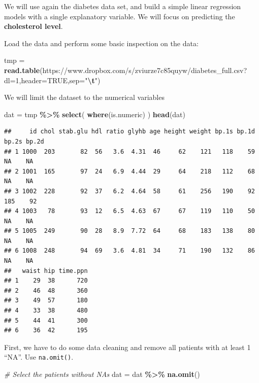 \documentclass[
]{book}
\newenvironment{Shaded}{\begin{snugshade}}{\end{snugshade}}
\newcommand{\AttributeTok}[1]{\textcolor[rgb]{0.13,0.29,0.53}{#1}}
\newcommand{\CommentTok}[1]{\textcolor[rgb]{0.56,0.35,0.01}{\textit{#1}}}
\newcommand{\ConstantTok}[1]{\textcolor[rgb]{0.56,0.35,0.01}{#1}}
\newcommand{\FunctionTok}[1]{\textcolor[rgb]{0.13,0.29,0.53}{\textbf{#1}}}
\newcommand{\NormalTok}[1]{#1}
\newcommand{\OtherTok}[1]{\textcolor[rgb]{0.56,0.35,0.01}{#1}}
\newcommand{\SpecialCharTok}[1]{\textcolor[rgb]{0.81,0.36,0.00}{\textbf{#1}}}
\newcommand{\StringTok}[1]{\textcolor[rgb]{0.31,0.60,0.02}{#1}}
\begin{document}
We will use again the diabetes data set, and build a simple linear regression models with a single explanatory variable.
We will focus on predicting the \textbf{cholesterol level}.

Load the data and perform some basic inspection on the data:

\begin{Shaded}
\begin{Highlighting}[]
\NormalTok{tmp }\OtherTok{=} \FunctionTok{read.table}\NormalTok{(}\StringTok{\textquotesingle{}https://www.dropbox.com/s/zviurze7c85quyw/diabetes\_full.csv?dl=1\textquotesingle{}}\NormalTok{,}\AttributeTok{header=}\ConstantTok{TRUE}\NormalTok{,}\AttributeTok{sep=}\StringTok{"}\SpecialCharTok{\textbackslash{}t}\StringTok{"}\NormalTok{) }
\end{Highlighting}
\end{Shaded}

We will limit the dataset to the numerical variables

\begin{Shaded}
\begin{Highlighting}[]
\NormalTok{dat }\OtherTok{=}\NormalTok{ tmp }\SpecialCharTok{\%\textgreater{}\%}
  \FunctionTok{select}\NormalTok{(}
    \FunctionTok{where}\NormalTok{(is.numeric)}
\NormalTok{  )}
\FunctionTok{head}\NormalTok{(dat)}
\end{Highlighting}
\end{Shaded}

\begin{verbatim}
##     id chol stab.glu hdl ratio glyhb age height weight bp.1s bp.1d bp.2s bp.2d
## 1 1000  203       82  56   3.6  4.31  46     62    121   118    59    NA    NA
## 2 1001  165       97  24   6.9  4.44  29     64    218   112    68    NA    NA
## 3 1002  228       92  37   6.2  4.64  58     61    256   190    92   185    92
## 4 1003   78       93  12   6.5  4.63  67     67    119   110    50    NA    NA
## 5 1005  249       90  28   8.9  7.72  64     68    183   138    80    NA    NA
## 6 1008  248       94  69   3.6  4.81  34     71    190   132    86    NA    NA
##   waist hip time.ppn
## 1    29  38      720
## 2    46  48      360
## 3    49  57      180
## 4    33  38      480
## 5    44  41      300
## 6    36  42      195
\end{verbatim}

First, we have to do some data cleaning and remove all patients with at least 1 ``NA''. Use \texttt{na.omit()}.

\begin{Shaded}
\begin{Highlighting}[]
\CommentTok{\# Select the patients without NAs}
\NormalTok{dat }\OtherTok{=}\NormalTok{ dat }\SpecialCharTok{\%\textgreater{}\%}
  \FunctionTok{na.omit}\NormalTok{()}
\end{Highlighting}
\end{Shaded}
\end{document}
